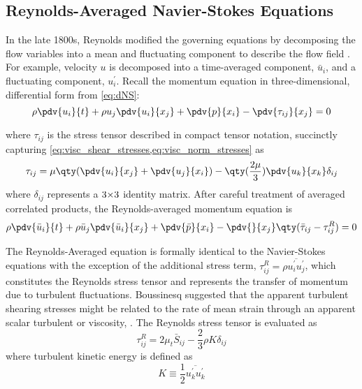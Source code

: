 \subsection{Reynolds-Averaged Navier-Stokes Equations}

In the late 1800s, Reynolds modified the governing equations by decomposing the flow variables into a mean and fluctuating component to describe the flow field \cite{Reynolds1903}. For example, velocity $u$ is decomposed into a time-averaged component, $\bar{u}_i$, and a fluctuating component, $u_i^\prime$. Recall the momentum equation in three-dimensional, differential form from \cref{eq:dNS}:
%
$$ \rho \pdv{u_i}{t} + \rho u_j \pdv{u_i}{x_j} + \pdv{p}{x_i} - \pdv{\tau_{ij}}{x_j} = 0 $$

where $\tau_{ij}$ is the stress tensor described in compact tensor notation, succinctly capturing \cref{eq:visc_shear_stresses,eq:visc_norm_stresses} as
%
$$ \tau_{ij} = \mu \qty(\pdv{u_i}{x_j} + \pdv{u_j}{x_i}) - \qty(\frac{2\mu}{3})\pdv{u_k}{x_k}\delta_{ij} $$
%
where $\delta_{ij}$ represents a $\medmuskip=0mu 3\times3$ identity matrix. After careful treatment of averaged correlated products, the Reynolds-averaged momentum equation is
%
%
\begin{equation} \rho \pdv{\bar{u}_i}{t} + \rho \bar{u}_j \pdv{\bar{u}_i}{x_j} + \pdv{\bar{p}}{x_i} - \pdv{}{x_j}\qty(\bar{\tau}_{ij} - \tau_{ij}^R) = 0 \label{eq:RANS} \end{equation}

%
The Reynolds-Averaged equation is formally identical to the Navier-Stokes equations with the exception of the additional stress term, $\tau_{ij}^R = \rho\overline{u_i^\prime u_j^\prime}$, which constitutes the Reynolds stress tensor and represents the transfer of momentum due to turbulent fluctuations. 
Boussinesq suggested that the apparent turbulent shearing stresses might be related to the rate of mean strain through an apparent scalar turbulent or  viscosity, . The Reynolds stress tensor is evaluated as
%
\begin{equation}\label{Boussinesq}
    \tau^R_{ij} = 2\mu_t\bar{S}_{ij} - \frac{2}{3}\rho K\delta_{ij}
\end{equation}
%
where turbulent kinetic energy is defined as
%
\begin{equation}\label{TKE}
    K \equiv \frac{1}{2}\overline{u^\prime_k u^\prime_k}
\end{equation}

